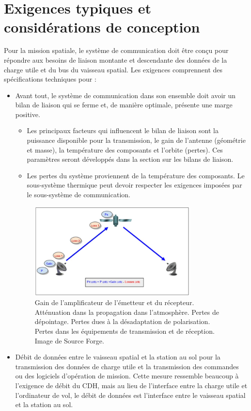 \section{Exigences typiques et considérations de conception}
Pour la mission spatiale, le système de communication doit être conçu pour répondre aux besoins de liaison montante et descendante des données de la charge utile et du bus du vaisseau spatial. Les exigences comprennent des spécifications techniques pour :
\begin{itemize}
\item Avant tout, le système de communication dans son ensemble doit avoir un bilan de liaison qui se ferme et, de manière optimale, présente une marge positive.
\begin{itemize}
\item Les principaux facteurs qui influencent le bilan de liaison sont la puissance disponible pour la transmission, le gain de l'antenne (géométrie et masse), la température des composants et l'orbite (pertes). Ces paramètres seront développés dans la section sur les bilans de liaison.
\item Les pertes du système proviennent de la température des composants. Le sous-système thermique peut devoir respecter les exigences imposées par le sous-système de communication.
\end{itemize}
\begin{figure}[H] %
    \centering
    \includegraphics[width=0.8\textwidth]{figures/6-6.jpg}
        \caption{Gain de l'amplificateur de l'émetteur et du récepteur. Atténuation dans la propagation dans l'atmosphère. Pertes de dépointage. Pertes dues à la désadaptation de polarisation. Pertes dans les équipements de transmission et de réception. Image de Source Forge.}
    \label{fig:communication2}
\end{figure}
\item Débit de données entre le vaisseau spatial et la station au sol pour la transmission des données de charge utile et la transmission des commandes ou des logiciels d'opération de mission. Cette mesure ressemble beaucoup à l'exigence de débit du CDH, mais au lieu de l'interface entre la charge utile et l'ordinateur de vol, le débit de données est l'interface entre le vaisseau spatial et la station au sol.

\end{itemize}
